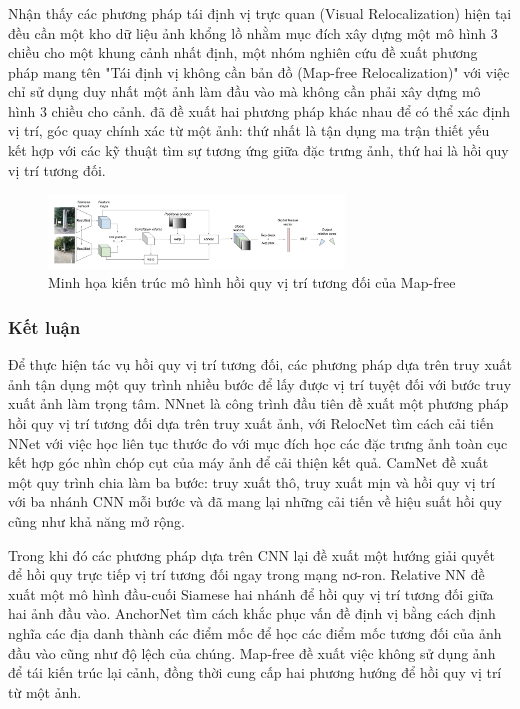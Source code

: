 \subsubsection*{}
Nhận thấy các phương pháp tái định vị trực quan (Visual Relocalization) hiện tại đều cần một kho dữ liệu ảnh khổng lồ nhằm mục đích xây dựng một mô hình 3 chiều cho một khung cảnh nhất định, một nhóm nghiên cứu \cite{arnold2022mapfree} đề xuất phương pháp mang tên "Tái định vị không cần bản đồ (Map-free Relocalization)" với việc chỉ sử dụng duy nhất một ảnh làm đầu vào mà không cần phải xây dựng mô hình 3 chiều cho cảnh. \cite{arnold2022mapfree} đã đề xuất hai phương pháp khác nhau để có thể xác định vị trí, góc quay chính xác từ một ảnh: thứ nhất là tận dụng ma trận thiết yếu kết hợp với các kỹ thuật tìm sự tương ứng giữa đặc trưng ảnh, thứ hai là hồi quy vị trí tương đối.
\begin{figure}[H]
    \centering
    \includegraphics[width=0.7\textwidth]{pics/Chapter2/mapfreeRPR}
    \caption{Minh họa kiến trúc mô hình hồi quy vị trí tương đối của Map-free \cite{arnold2022mapfree}}
\end{figure}

\subsubsection*{Kết luận}
Để thực hiện tác vụ hồi quy vị trí tương đối, các phương pháp dựa trên truy xuất ảnh \cite{laskar2017camera, 10.1007/978-3-030-01264-9_46, 9008579, zhou2020learn} tận dụng một quy trình nhiều bước để lấy được vị trí tuyệt đối với bước truy xuất ảnh làm trọng tâm. NNnet \cite{laskar2017camera} là công trình đầu tiên đề xuất một phương pháp hồi quy vị trí tương đối dựa trên truy xuất ảnh, với RelocNet \cite{10.1007/978-3-030-01264-9_46} tìm cách cải tiến NNet với việc học liên tục thước đo với mục đích học các đặc trưng ảnh toàn cục kết hợp góc nhìn chóp cụt của máy ảnh để cải thiện kết quả. CamNet \cite{9008579} đề xuất một quy trình chia làm ba bước: truy xuất thô, truy xuất mịn và hồi quy vị trí với ba nhánh CNN mỗi bước và đã mang lại những cải tiến về hiệu suất hồi quy cũng như khả năng mở rộng.

Trong khi đó các phương pháp dựa trên CNN \cite{melekhov2017relative, saha2018improved, arnold2022mapfree} lại đề xuất một hướng giải quyết để hồi quy trực tiếp vị trí tương đối ngay trong mạng nơ-ron. Relative NN \cite{melekhov2017relative} đề xuất một mô hình đầu-cuối Siamese hai nhánh để hồi quy vị trí tương đối giữa hai ảnh đầu vào. AnchorNet \cite{saha2018improved} tìm cách khắc phục vấn đề định vị bằng cách định nghĩa các địa danh thành các điểm mốc để học các điểm mốc tương đối của ảnh đầu vào cũng như độ lệch của chúng. Map-free \cite{arnold2022mapfree} đề xuất việc không sử dụng ảnh để tái kiến trúc lại cảnh, đồng thời cung cấp hai phương hướng để hồi quy vị trí từ một ảnh.

